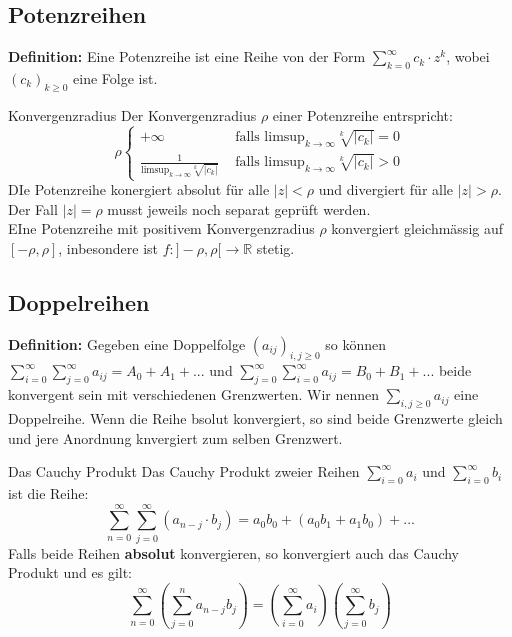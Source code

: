 \documentclass[a4paper,8pt]{extarticle}
\newenvironment{definition}{
   \noindent \textbf{Definition:  }}{}
\def\R{\mathbb{R}}
\begin{document}
\subsection{Potenzreihen}
\begin{definition}
  Eine Potenzreihe ist eine Reihe von der Form $\sum_{k = 0}^\infty c_k \cdot z^k$, wobei $(c_k)_{k \geq 0}$ eine Folge ist.
\end{definition}
\begin{mainbox}{Konvergenzradius}
  Der Konvergenzradius $\rho$ einer Potenzreihe entrspricht: $$ \rho \begin{cases}
    + \infty & \text{ falls limsup}_{k \to \infty} \sqrt[k]{|c_k|} = 0\\
    \frac{1}{\text{limsup}_{k \to \infty} \sqrt[k]{|c_k|}} & \text{ falls limsup}_{k \to \infty} \sqrt[k]{|c_k|} > 0
  \end{cases} $$
  DIe Potenzreihe konergiert absolut für alle $|z| < \rho$ und divergiert für alle $|z| > \rho$. Der Fall $|z| = \rho$ musst jeweils noch separat geprüft werden. \\
  EIne Potenzreihe mit positivem Konvergenzradius $\rho$ konvergiert gleichmässig auf $[-\rho, \rho]$, inbesondere ist $f:]-\rho, \rho[\to \R$ stetig.
\end{mainbox}

\subsection{Doppelreihen}

\begin{definition}
  Gegeben eine Doppelfolge $(a_{ij})_{i,j \geq 0}$ so können \\ $\sum_{i=0}^\infty \sum_{j=0}^\infty a_{ij} = A_0 + A_1 + ...$ und $\sum_{j=0}^\infty \sum_{i=0}^\infty a_{ij} = B_0 + B_1 + ...$ beide konvergent sein mit verschiedenen Grenzwerten. Wir nennen $\sum_{i, j \geq 0} a_{ij}$ eine Doppelreihe. Wenn die Reihe bsolut konvergiert, so sind beide Grenzwerte gleich und jere Anordnung knvergiert zum selben Grenzwert.
\end{definition}

\begin{mainbox}{Das Cauchy Produkt}
  Das Cauchy Produkt zweier Reihen $\sum_{i=0}^{\infty} a_i$ und $\sum_{i=0}^{\infty} b_i$ ist die Reihe: 
  $$\sum_{n=0}^{\infty} \sum_{j=0}^\infty (a_{n-j} \cdot b_j) = a_0 b_0 + (a_0 b_1 + a_1 b_0) + ...$$
  Falls beide Reihen \textbf{absolut} konvergieren, so konvergiert auch das Cauchy Produkt und es gilt:
  $$\sum_{n=0}^\infty \left(\sum_{j=0}^n a_{n-j}b_j\right) = \left(\sum_{i=0}^\infty a_i\right) \left(\sum_{j=0}^\infty b_j\right)$$
\end{mainbox}
\end{document}
